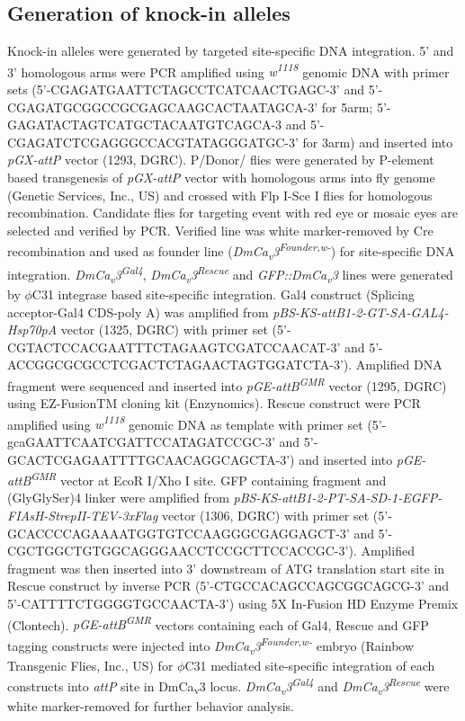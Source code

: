 \subsection*{Generation of knock-in alleles}

Knock-in alleles were generated by targeted site-specific DNA integration. 
5’ and 3’ homologous arms were PCR amplified using \emph{w\textsuperscript{1118}} genomic DNA with primer sets (5’-CGAGATGAATTCTAGCCTCATCAACTGAGC-3’ and 5’-CGAGATGCGGCCGCGAGCAAGCACTAATAGCA-3’ for 5arm; 5’-GAGATACTAGTCATGCTACAATGTCAGCA-3 and 5’-CGAGATCTCGAGGGCCACGTATAGGGATGC-3’ for 3arm) and inserted into \emph{pGX-attP} vector (1293, DGRC). 
P/{Donor/} flies were generated by P-element based transgenesis of \emph{pGX-attP} vector with homologous arms into fly genome (Genetic Services, Inc., US) and crossed with Flp I-Sce I flies for homologous recombination. 
Candidate flies for targeting event with red eye or mosaic eyes are selected and verified by PCR. 
Verified line was white marker-removed by Cre recombination and used as founder line (\emph{DmCa\textsubscript{v}3\textsuperscript{Founder,w-}}) for site-specific DNA integration.
\emph{DmCa\textsubscript{v}3\textsuperscript{Gal4}}, \emph{DmCa\textsubscript{v}3\textsuperscript{Rescue}} and \emph{GFP::DmCa\textsubscript{v}3} lines were generated by $\phi$C31 integrase based site-specific integration. 
Gal4 construct (Splicing acceptor-Gal4 CDS-poly A) was amplified from \emph{pBS-KS-attB1-2-GT-SA-GAL4-Hsp70pA} vector (1325, DGRC) with primer set (5’-CGTACTCCACGAATTTCTAGAAGTCGATCCAACAT-3’ and 5’-ACCGGCGCGCCTCGACTCTAGAACTAGTGGATCTA-3’). 
Amplified DNA fragment were sequenced and inserted into \emph{pGE-attB\textsuperscript{GMR}} vector (1295, DGRC) using EZ-FusionTM cloning kit (Enzynomics). 
Rescue construct were PCR amplified using \emph{w\textsuperscript{1118}} genomic DNA as template with primer set (5’-gcaGAATTCAATCGATTCCATAGATCCGC-3’ and 5’-GCACTCGAGAATTTTGCAACAGGCAGCTA-3’) and inserted into \emph{pGE-attB\textsuperscript{GMR}} vector at EcoR I/Xho I site. 
GFP containing fragment and (GlyGlySer)4 linker were amplified from \emph{pBS-KS-attB1-2-PT-SA-SD-1-EGFP-FIAsH-StrepII-TEV-3xFlag} vector (1306, DGRC) with primer set (5’-GCACCCCAGAAAATGGTGTCCAAGGGCGAGGAGCT-3’ and 5’-CGCTGGCTGTGGCAGGGAACCTCCGCTTCCACCGC-3’). 
Amplified fragment was then inserted into 3’ downstream of ATG translation start site in Rescue construct by inverse PCR (5’-CTGCCACAGCCAGCGGCAGCG-3’ and 5’-CATTTTCTGGGGTGCCAACTA-3’) using 5X In-Fusion HD Enzyme Premix (Clontech).       
\emph{pGE-attB\textsuperscript{GMR}} vectors containing each of Gal4, Rescue and GFP tagging constructs were injected into \emph{DmCa\textsubscript{v}3\textsuperscript{Founder,w-}} embryo (Rainbow Transgenic Flies, Inc., US) for $\phi$C31 mediated site-specific integration of each constructs into \emph{attP} site in DmCa\textsubscript{v}3 locus. \emph{DmCa\textsubscript{v}3\textsuperscript{Gal4}} and \emph{DmCa\textsubscript{v}3\textsuperscript{Rescue}} were white marker-removed for further behavior analysis.

  
  
  
  
  
  